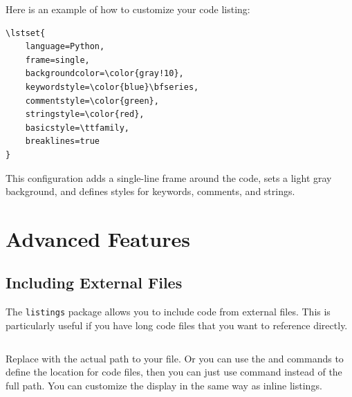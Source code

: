 			Here is an example of how to customize your code listing:

			\begin{lstlisting}[style=LaTeXStyle]
\lstset{
	language=Python,
	frame=single,
	backgroundcolor=\color{gray!10},
	keywordstyle=\color{blue}\bfseries,
	commentstyle=\color{green},
	stringstyle=\color{red},
	basicstyle=\ttfamily,
	breaklines=true
}
			\end{lstlisting}

			This configuration adds a single-line frame around the code, sets a light gray background, and defines styles for keywords, comments, and strings.




	\section{Advanced Features}

		\subsection{Including External Files}

			The \texttt{listings} package allows you to include code from external files. 
			This is particularly useful if you have long code files that you want to reference directly.

			\begin{lstlisting}[style=LaTeXStyle]

			\end{lstlisting}

			Replace  with the actual path to your file.
			Or you can use the  and  commands to define the location for code files, then you can just use  command instead of the full path.
			You can customize the display in the same way as inline listings.



